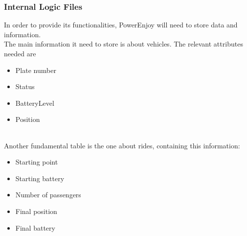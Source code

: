 \subsubsection{Internal Logic Files}
In order to provide its functionalities, PowerEnjoy will need to store data and information.\\
The main information it need to store is about vehicles. The relevant attributes needed are 
\begin{itemize}
\item Plate number
\item Status
\item BatteryLevel
\item Position
\end{itemize}
\\
Another fundamental table is the one about rides, containing this information:
\begin{itemize}
\item Starting point
\item Starting battery
\item Number of passengers
\item Final position
\item Final battery
\end{itemize}